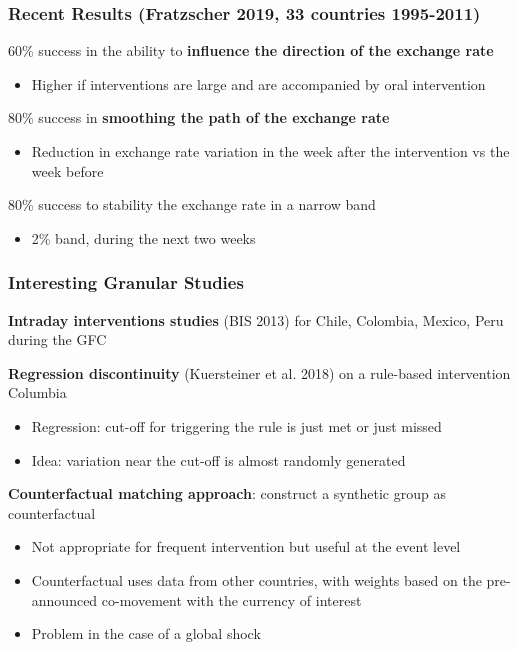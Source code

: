 \documentclass{beamer}
\newenvironment{wideitemize}{\itemize\addtolength{\itemsep}{10pt}}{\enditemize}
\newenvironment{wideenumerate}{\enumerate\addtolength{\itemsep}{10pt}}{\endenumerate}
\begin{document}
\begin{frame}
  \frametitle{Recent Results (Fratzscher 2019, 33 countries 1995-2011)}
  \begin{wideenumerate}
  \item 60\% success in the ability to \textbf{influence the direction of the exchange rate}
    \begin{itemize}
    \item Higher if interventions are large and are accompanied by oral intervention
    \end{itemize}
  \item 80\% success in \textbf{smoothing the path of the exchange rate}
    \begin{itemize}
    \item Reduction in exchange rate variation in the week after the intervention vs the week before
    \end{itemize}
  \item 80\% success to stability the exchange rate in a narrow band
    \begin{itemize}
    \item 2\% band, during the next two weeks
    \end{itemize}
  \end{wideenumerate}
\end{frame}



\begin{frame}
  \frametitle{Interesting Granular Studies}
  \begin{wideitemize}
  \item \textbf{Intraday interventions studies} (BIS 2013) for Chile, Colombia, Mexico, Peru during the GFC
  \item \textbf{Regression discontinuity} (Kuersteiner et al. 2018) on a rule-based intervention Columbia
    \begin{itemize}
    \item Regression: cut-off for triggering the rule is just met or just missed
    \item Idea: variation near the cut-off is almost randomly generated
    \end{itemize}
  \item \textbf{Counterfactual matching approach}: construct a synthetic group as counterfactual
    \begin{itemize}
    \item Not appropriate for frequent intervention but useful at the event level
    \item Counterfactual uses data from other countries, with weights based on the pre-announced co-movement with the currency of interest
    \item Problem in the case of a global shock
    \end{itemize}
    
  \end{wideitemize}
\end{frame}
\end{document}
